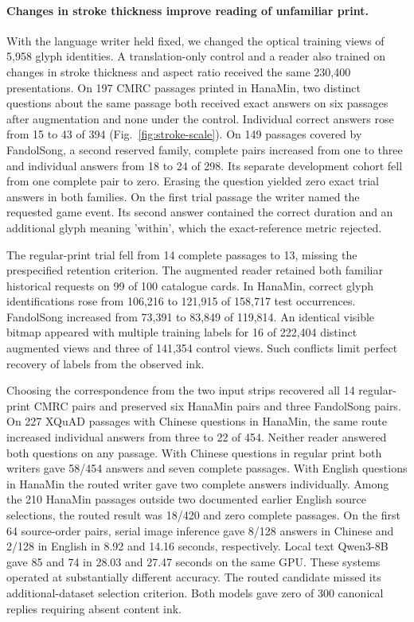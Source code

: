 \documentclass[12pt,a4paper]{article}
\providecommand{\DIFadd}[1]{{\protect\color{blue} \sf #1}} %
\begin{document}
\paragraph{\DIFadd{Changes in stroke thickness improve reading of unfamiliar print.}}
\DIFadd{With the language writer held fixed, we changed the optical training views of 5,958 glyph identities. A translation-only control and a reader also trained on changes in stroke thickness and aspect ratio received the same 230,400 presentations. On 197 CMRC passages printed in HanaMin, two distinct questions about the same passage both received exact answers on six passages after augmentation and none under the control. Individual correct answers rose from 15 to 43 of 394 (Fig.~\ref{fig:stroke-scale}). On 149 passages covered by FandolSong, a second reserved family, complete pairs increased from one to three and individual answers from 18 to 24 of 298. Its separate development cohort fell from one complete pair to zero. Erasing the question yielded zero exact trial answers in both families. On the first trial passage the writer named the requested game event. Its second answer contained the correct duration and an additional glyph meaning 'within', which the exact-reference metric rejected.
}

\DIFadd{The regular-print trial fell from 14 complete passages to 13, missing the prespecified retention criterion. The augmented reader retained both familiar historical requests on 99 of 100 catalogue cards. In HanaMin, correct glyph identifications rose from 106,216 to 121,915 of 158,717 test occurrences. FandolSong increased from 73,391 to 83,849 of 119,814. An identical visible bitmap appeared with multiple training labels for 16 of 222,404 distinct augmented views and three of 141,354 control views. Such conflicts limit perfect recovery of labels from the observed ink.
}

\DIFadd{Choosing the correspondence from the two input strips recovered all 14 regular-print CMRC pairs and preserved six HanaMin pairs and three FandolSong pairs. On 227 XQuAD passages with Chinese questions in HanaMin, the same route increased individual answers from three to 22 of 454. Neither reader answered both questions on any passage. With Chinese questions in regular print both writers gave 58/454 answers and seven complete passages. With English questions in HanaMin the routed writer gave two complete answers individually. Among the 210 HanaMin passages outside two documented earlier English source selections, the routed result was 18/420 and zero complete passages. On the first 64 source-order pairs, serial image inference gave 8/128 answers in Chinese and 2/128 in English in 8.92 and 14.16 seconds, respectively. Local text Qwen3-8B gave 85 and 74 in 28.03 and 27.47 seconds on the same GPU. These systems operated at substantially different accuracy. The routed candidate missed its additional-dataset selection criterion. Both models gave zero of 300 canonical replies requiring absent content ink.
}
\end{document}
